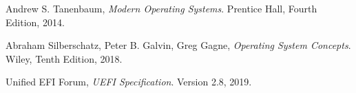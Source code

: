 \documentclass[12pt]{article}
\begin{document}
\begin{thebibliography}{9}
Andrew S. Tanenbaum, \textit{Modern Operating Systems}. Prentice Hall, Fourth Edition, 2014.

Abraham Silberschatz, Peter B. Galvin, Greg Gagne, \textit{Operating System Concepts}. Wiley, Tenth Edition, 2018.

Unified EFI Forum, \textit{UEFI Specification}. Version 2.8, 2019.

\end{thebibliography}
\end{document}
